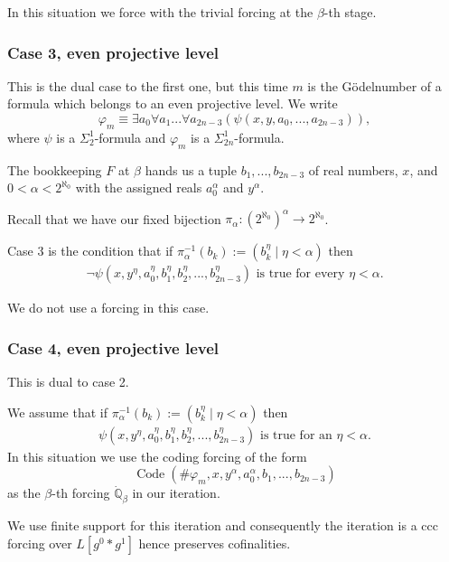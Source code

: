 \documentclass[a4paper,11pt]{article}
\newcommand{\forceQ}{\mathbb{Q}}
\begin{document}
In this situation we force with the trivial forcing at the $\beta$-th stage. 


\subsubsection{Case 3, even projective level}
This is the dual case to the first one, but this time $m$ is the G\"odelnumber of a formula which belongs to an even projective level. We write
\[\varphi_m \equiv \exists a_0 \forall a_1... \forall a_{2n-3} (\psi (x,y,a_0,...,a_{2n-3} )),\]
where $\psi$ is a $\Sigma^1_2$-formula and $\varphi_m$ is a $\Sigma^1_{2n}$-formula.

The bookkeeping $F$ at $\beta$ hands us
a tuple $b_1,...,b_{2n-3}$ of real numbers, $x$, and $0<\alpha< 2^{\aleph_0}$ with the assigned reals $a_0^{\alpha}$ and $y^{\alpha}$.

Recall that we have our fixed bijection $\pi_{\alpha}:( 2^{\aleph_0})^{\alpha} \rightarrow 2^{\aleph_0}$.

Case 3 is the condition that if $\pi_{\alpha}^{-1} (b_k):= (b^{\eta}_k \mid \eta < \alpha)$ then
\begin{align*}
\lnot \psi (x,y^{\eta},a_0^{\eta}, b_1^{\eta}, b_2^{\eta},...,b_{2n-3}^{\eta} ) \text{ is true for every $\eta < \alpha$.}
\end{align*}



 
We do not use a forcing in this case.


\subsubsection{Case 4, even projective level}
This is dual to  case 2. 

We  assume that if $\pi_{\alpha}^{-1} (b_k):= (b^{\eta}_k \mid \eta < \alpha)$ then
\begin{align*}
 \psi (x,y^{\eta},a_0^{\eta}, b_1^{\eta}, b_2^{\eta},...,b_{2n-3}^{\eta} ) \text{ is true for an $\eta < \alpha$.}
\end{align*}
In this situation we use the coding forcing of the form
\[ \operatorname{Code} (\# \varphi_m, x,y^{\alpha}, a_0^{\alpha},b_1,...,b_{2n-3} ) \]
as the $\beta$-th forcing $\dot{\forceQ}_{\beta}$ in our iteration. 


\par
\medskip
We use finite support for this iteration and consequently the iteration is a ccc forcing over $L[g^0 \ast g^1]$ hence preserves cofinalities.
\end{document}
